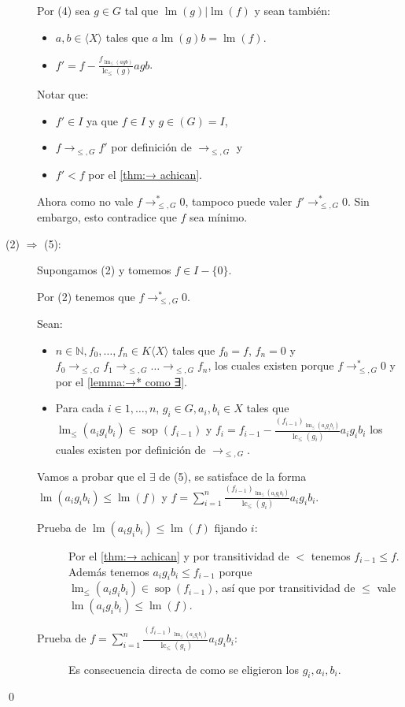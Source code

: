 \documentclass[12pt]{report}
\theoremstyle{customstyle}
\renewenvironment{proof}[1][\proofname]{{\noindent \bfseries #1: }}{\qed} %
\theoremstyle{factstyle}
\DeclareMathOperator{\sop}{sop}
\DeclareMathOperator{\lm}{lm}
\DeclareMathOperator{\lc}{lc}
\begin{document}
\begin{proof}
\begin{description}
    Por (4) sea $g ∈ G$ tal que $\lm(g) | \lm(f)$ y sean también:
    \begin{itemize}
      \item $a, b ∈ ⟨X⟩$ tales que $a \lm(g) b = \lm(f)$.
      \item $f' = f - \frac{f_{\lm_≤(agb)}}{\lc_≤(g)}agb$.
    \end{itemize}

    Notar que:

    \begin{itemize}
      \item $f' ∈ I$ ya que $f ∈ I$ y $g ∈ (G) = I$,
      \item $f →_{≤, G} f'$ por definición de $→_{≤, G}$ y
      \item $f' < f$ por el \cref{thm:→ achican}.
    \end{itemize}

    \noindent Ahora como no vale $f →^*_{≤, G} 0$, tampoco puede valer $f' →^*_{≤, G} 0$. Sin embargo, esto contradice que $f$ sea mínimo.

    \item[(2) $⇒$ (5):] Supongamos (2) y tomemos $f ∈ I - \{0\}$.

    Por (2) tenemos que $f →^*_{≤, G} 0$.

    Sean:
    \begin{itemize}
      \item $n ∈ ℕ, f_0, …, f_n ∈ K⟨X⟩$ tales que $f_0 = f$, $f_n = 0$ y $f_0 →_{≤, G} f_1 →_{≤, G} … →_{≤, G} f_n$, los cuales existen porque $f →^*_{≤, G} 0$ y por el \cref{lemma:→* como ∃}.
      \item Para cada $i ∈ {1, …, n}$, $g_i ∈ G, a_i, b_i ∈ X$ tales que $\lm_≤(a_i g_i b_i) ∈ \sop(f_{i-1})$ y $f_i = f_{i-1} - \frac{(f_{i-1})_{\lm_≤(a_i g_i b_i)}}{\lc_≤(g_i)}a_i g_i b_i$ los cuales existen por definición de $→_{≤, G}$.
    \end{itemize}

    Vamos a probar que el $∃$ de (5), se satisface de la forma $\lm(a_i g_i b_i) ≤ \lm(f)$ y $f = ∑_{i = 1}^n \frac{(f_{i-1})_{\lm_≤(a_i g_i b_i)}}{\lc_≤(g_i)} a_i g_i b_i$.

    \begin{description}
      \item[Prueba de $\lm(a_i g_i b_i) ≤ \lm(f)$ fijando $i$:] Por el \cref{thm:→ achican} y por transitividad de $<$ tenemos $f_{i-1} ≤ f$. Además tenemos $a_i g_i b_i ≤ f_{i-1}$ porque $\lm_≤(a_i g_i b_i) ∈ \sop(f_{i-1})$, así que por transitividad de $≤$ vale $\lm(a_i g_i b_i) ≤ \lm(f)$.
      \item[Prueba de $f = ∑_{i = 1}^n \frac{(f_{i-1})_{\lm_≤(a_i g_i b_i)}}{\lc_≤(g_i)} a_i g_i b_i$:] Es consecuencia directa de como se eligieron los $g_i, a_i, b_i$.
    \end{description}


\end{description}
\end{proof}
\end{document}
